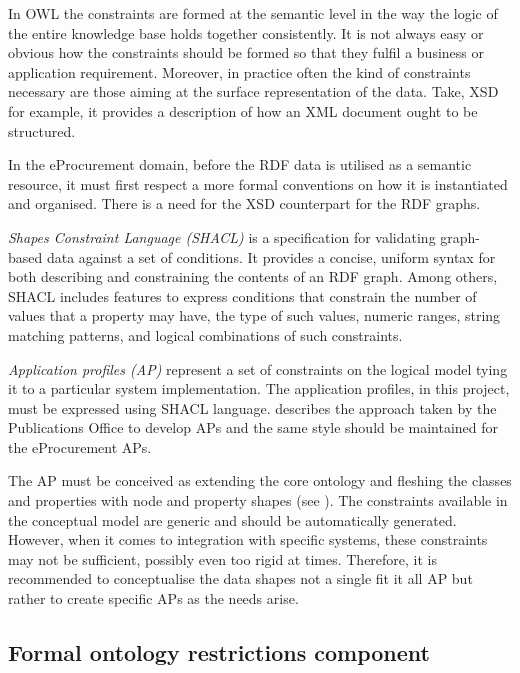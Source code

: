 	In OWL the constraints are formed at the semantic level in the way the logic of the entire knowledge base holds together consistently. It is not always easy or obvious how the constraints should be formed so that they fulfil a business or application requirement. Moreover, in practice often the kind of constraints necessary are those aiming at the surface representation of the data. Take, XSD for example, it provides a description of how an XML document ought to be structured.
	
	In the eProcurement domain, before the RDF data is utilised as a semantic resource, it must first respect a more formal conventions on how it is instantiated and organised. There is a need for the XSD counterpart for the RDF graphs. 
	
	\textit{Shapes Constraint Language (SHACL)} \cite{shacl-spec} is a specification for validating graph-based data against a set of conditions. It provides a concise, uniform syntax for both describing and constraining the contents of an RDF graph. Among others, SHACL includes features to express conditions that constrain the number of values that a property may have, the type of such values, numeric ranges, string matching patterns, and logical combinations of such constraints.

	\textit{Application profiles (AP)} represent a set of constraints on the logical model tying it to a particular system implementation. The application profiles, in this project, must be expressed using SHACL language. \citet{costetchi2016} describes the approach taken by the Publications Office to develop APs and the same style should be maintained for the eProcurement APs. 
	
	The AP must be conceived as extending the core ontology and fleshing the classes and properties with node and property shapes (see \cite[Sec 2.2--2.3]{shacl-spec}). The constraints available in the conceptual model are generic and should be automatically generated. However, when it comes to integration with specific systems, these constraints may not be sufficient, possibly even too rigid at times. Therefore, it is recommended to conceptualise the data shapes not a single fit it all AP but rather to create specific APs as the needs arise. 
	
	\subsection{Formal ontology restrictions component}
	\label{sec:restrictions}
	
